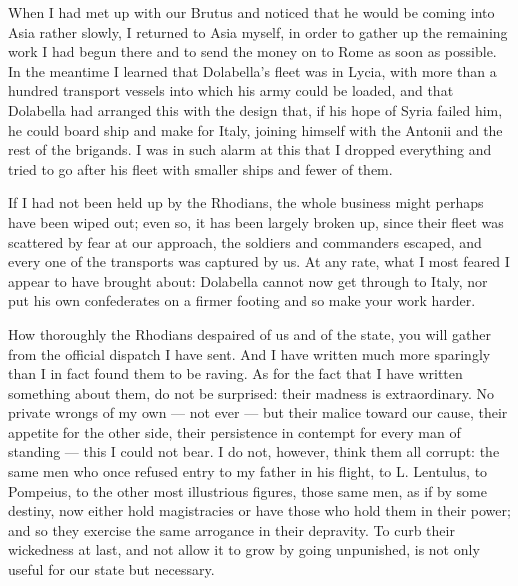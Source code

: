 

 When I had met up with our Brutus and noticed that he would be coming into Asia rather slowly, I returned to Asia myself, in order to gather up the remaining work I had begun there and to send the money on to Rome as soon as possible. In the meantime I learned that Dolabella's fleet was in Lycia, with more than a hundred transport vessels into which his army could be loaded, and that Dolabella had arranged this with the design that, if his hope of Syria failed him, he could board ship and make for Italy, joining himself with the Antonii and the rest of the brigands. I was in such alarm at this that I dropped everything and tried to go after his fleet with smaller ships and fewer of them.

 If I had not been held up by the Rhodians, the whole business might perhaps have been wiped out; even so, it has been largely broken up, since their fleet was scattered by fear at our approach, the soldiers and commanders escaped, and every one of the transports was captured by us. At any rate, what I most feared I appear to have brought about: Dolabella cannot now get through to Italy, nor put his own confederates on a firmer footing and so make your work harder.

 How thoroughly the Rhodians despaired of us and of the state, you will gather from the official dispatch I have sent. And I have written much more sparingly than I in fact found them to be raving. As for the fact that I have written something about them, do not be surprised: their madness is extraordinary. No private wrongs of my own --- not ever --- but their malice toward our cause, their appetite for the other side, their persistence in contempt for every man of standing --- this I could not bear. I do not, however, think them all corrupt: the same men who once refused entry to my father in his flight, to L. Lentulus, to Pompeius, to the other most illustrious figures, those same men, as if by some destiny, now either hold magistracies or have those who hold them in their power; and so they exercise the same arrogance in their depravity. To curb their wickedness at last, and not allow it to grow by going unpunished, is not only useful for our state but necessary.

